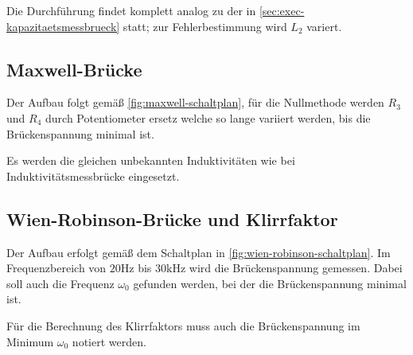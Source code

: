 Die Durchführung findet komplett analog zu der in \autoref{sec:exec-kapazitaetsmessbrueck} statt; zur
Fehlerbestimmung wird $L_2$ variert.

\subsection{Maxwell-Brücke}
\label{sec:exec-maxwell-bruecke}

Der Aufbau folgt gemäß \autoref{fig:maxwell-schaltplan}, für die Nullmethode werden $R_3$ und 
$R_4$ durch Potentiometer ersetz welche so lange variiert werden, bis die Brückenspannung 
minimal ist.

Es werden die gleichen unbekannten Induktivitäten wie bei Induktivitätsmessbrücke 
eingesetzt.

\subsection{Wien-Robinson-Brücke und Klirrfaktor}
\label{sec:exec-wien-robinson-bruecke}

Der Aufbau erfolgt gemäß dem Schaltplan in \autoref{fig:wien-robinson-schaltplan}. Im 
Frequenzbereich von $20\si{\hertz}$ bis $30\si{\kilo\hertz}$ wird die Brückenspannung gemessen. 
Dabei soll auch die Frequenz $\omega_0$ gefunden werden, bei der die Brückenspannung minimal ist.

Für die Berechnung des Klirrfaktors muss auch die Brückenspannung im Minimum $\omega_0$ notiert werden.
